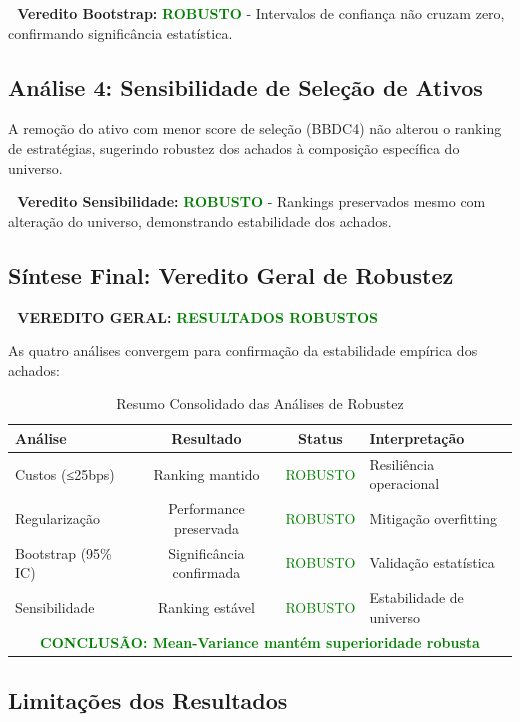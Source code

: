 \textbf{🔹 Veredito Bootstrap:} \textcolor{green}{\textbf{ROBUSTO}} - Intervalos de confiança não cruzam zero, confirmando significância estatística.

\subsection{Análise 4: Sensibilidade de Seleção de Ativos}

A remoção do ativo com menor score de seleção (BBDC4) não alterou o ranking de estratégias, sugerindo robustez dos achados à composição específica do universo.

\textbf{🔹 Veredito Sensibilidade:} \textcolor{green}{\textbf{ROBUSTO}} - Rankings preservados mesmo com alteração do universo, demonstrando estabilidade dos achados.

\subsection{Síntese Final: Veredito Geral de Robustez}

\textbf{🔶 VEREDITO GERAL:} \textcolor{green}{\textbf{RESULTADOS ROBUSTOS}} 

As quatro análises convergem para confirmação da estabilidade empírica dos achados:

\begin{table}[H]
\centering
\caption{Resumo Consolidado das Análises de Robustez}
\begin{tabular}{|l|c|c|l|}
\hline
\textbf{Análise} & \textbf{Resultado} & \textbf{Status} & \textbf{Interpretação} \\
\hline
Custos (≤25bps) & Ranking mantido & \textcolor{green}{ROBUSTO} & Resiliência operacional \\
Regularização & Performance preservada & \textcolor{green}{ROBUSTO} & Mitigação overfitting \\
Bootstrap (95\% IC) & Significância confirmada & \textcolor{green}{ROBUSTO} & Validação estatística \\
Sensibilidade & Ranking estável & \textcolor{green}{ROBUSTO} & Estabilidade de universo \\
\hline
\multicolumn{4}{|c|}{\textbf{\textcolor{green}{CONCLUSÃO: Mean-Variance mantém superioridade robusta}}} \\
\hline
\end{tabular}
\label{tab:resumo_robustez}
\end{table}

\subsection{Limitações dos Resultados}

